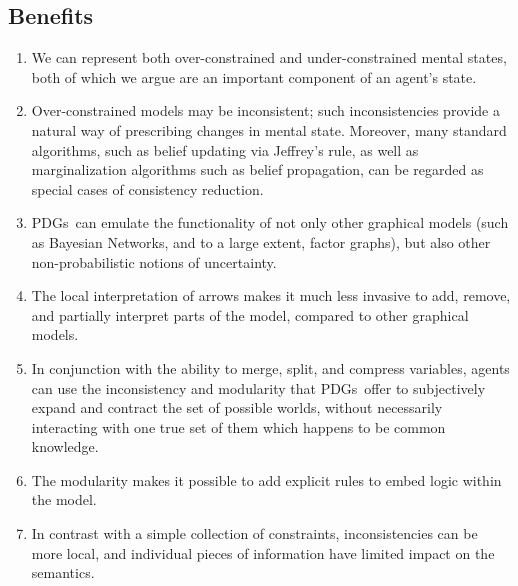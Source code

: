\documentclass{article}
\newcommand\changed[1]{{\color{note-fg} #1}}
\newcommand{\MNs}{PDGs}
\begin{document}
	\subsection{Benefits}\label{sec:list-of-benefits}
	\begin{enumerate}[nosep]
		\item We can represent both over-constrained and under-constrained mental states, both of which we argue are an important component of an agent's state.
		\item Over-constrained models may be inconsistent; such inconsistencies provide a natural way of prescribing changes in mental state. Moreover, many standard algorithms, such as belief updating via Jeffrey's rule, as well as marginalization algorithms such as belief propagation, can be regarded as special cases of consistency reduction.
		\item \MNs\ can emulate the functionality of not only other graphical models (such as Bayesian Networks, and to a large extent, factor graphs), but also other non-probabilistic notions of uncertainty.
		\item The local interpretation of arrows makes it much less invasive to add, remove, and partially interpret parts of the model, compared to other graphical models.
		\item In conjunction with the ability to merge, split, and compress variables, agents can use the inconsistency and modularity that \MNs\ offer to subjectively expand and contract the set of possible worlds, without necessarily interacting with one true set of them which happens to be common knowledge. %
		\item The modularity makes it possible to add explicit rules to embed logic within the model.
		\item In contrast with a simple collection of constraints, inconsistencies \changed{can be more local, and individual pieces of information have limited impact on the semantics.}
	\end{enumerate} %


\end{document}

